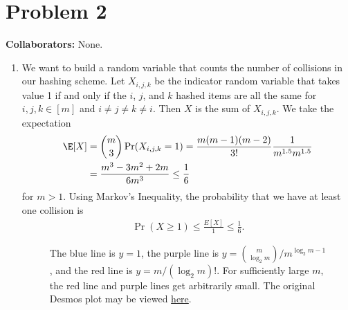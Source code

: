\newpage
\section*{Problem 2}
\textbf{Collaborators:}  None.
\medskip

\begin{enumerate}
    \item We want to build a random variable that counts the
    number of collisions in our hashing scheme.
    Let $X_{i,j,k}$ be the indicator random variable that takes
    value 1 if and only if the $i$, $j$, and $k$ hashed items are all 
    the same for $i,j,k \in [m]$ and $i\neq j \neq k \neq i$.
    Then $X$ is the sum of $X_{i,j,k}$.
    We take the expectation
    \begin{align}
        \E[X] &= \binom{m}{3} \Pr(X_{i,j,k}=1) =
        \frac{m(m-1)(m-2)}{3!} \frac{1}{m^{1.5}m^{1.5}} \nonumber \\
        &= \frac{m^3 -3m^2 + 2m}{6m^3} \leq \frac{1}{6}
        \nonumber
    \end{align}
    for $m > 1$.
    Using Markov's Inequality, the probability that we have at least
    one collision is
    \begin{align}
        \Pr(X \geq 1) \leq \frac{E[X]}{1} \leq \frac{1}{6} \nonumber.
    \end{align}
    \qedsymbol
    
    \begin{figure}[H]
        \centering
        \caption{The blue line is $y=1$, the purple line is
        $y=\binom{m}{\log_2 m}/m^{\log_2 m -1}$, and the red line
        is $y = m/(\log_2 m)!$.
        For sufficiently large $m$, the red line and purple lines
        get arbitrarily small.
        The original Desmos plot may be viewed 
        \href{https://www.desmos.com/calculator/64kvnqp8ho}{here}.}
        \label{fig:1.2.2}
    \end{figure}
    

\end{enumerate}
